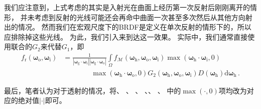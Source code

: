 我们应注意到，上式考虑的其实是入射光在曲面上经历第一次反射后刚刚离开的情形，
并未考虑到反射的光线可能还会再命中曲面一次甚至多次然后从其他方向射出的情况。
然而我们在宏观尺度下的BRDF是定义在单次反射的情形下的，所以应排除掉这些光线。
为此，我们引入来到达这一效果。
实际中，我们通常直接使用联合的$G_2$来代替$G_1$，即
\begin{align}\label{eq:08ex01-MacroBRDFG2}
    f_{\mathrm{r}}({\bm\omega}_{\mathrm{o}},{\bm\omega}_{\mathrm{i}})
     & =\frac{1}{|{\bm\omega}_{\mathrm{g}}\cdot{\bm\omega}_{\mathrm{i}}||{\bm\omega}_{\mathrm{g}}\cdot{\bm\omega}_{\mathrm{o}}|}
    \int\limits_{\varOmega}f_{\mathcal{M}}({\bm\omega}_{\mathrm{h}},{\bm\omega}_{\mathrm{o}},{\bm\omega}_{\mathrm{i}})
    \max({\bm\omega}_{\mathrm{h}}\cdot{\bm\omega}_{\mathrm{i}},0)\nonumber                                                       \\
     & \qquad\qquad\max({\bm\omega}_{\mathrm{h}}\cdot{\bm\omega}_{\mathrm{o}},0)
    G_2({\bm\omega}_{\mathrm{h}},{\bm\omega}_{\mathrm{o}},{\bm\omega}_{\mathrm{i}})
    D({\bm\omega}_{\mathrm{h}})\mathrm{d}{\bm\omega}_{\mathrm{h}}\, .
\end{align}

最后，笔者认为对于透射的情况，将、
、
、
、、
、
中的$\max(\cdot,0)$项均改为对应的绝对值$|\cdot|$即可。

